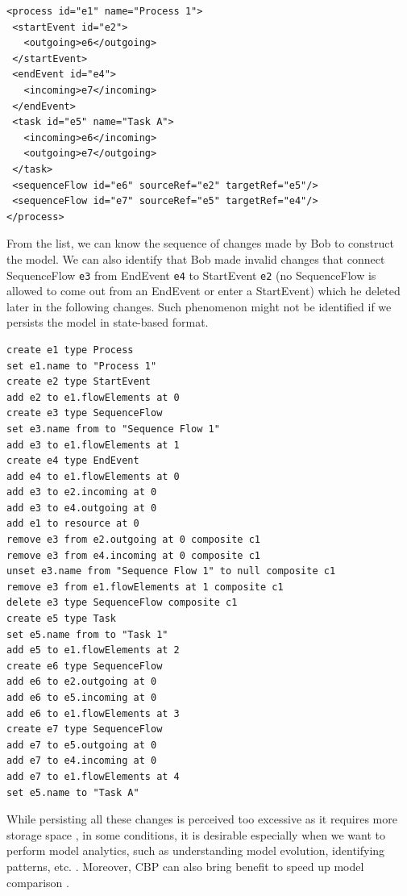 \documentclass[conference]{IEEEtran}
\begin{document}
\vspace{-15pt}
\begin{lstlisting}[style=eol,numbersep=1pt,caption={A BPMN2 model in Fig. \ref{fig:bpmn2} persisted in simplified XMI.},label=lst:bpmn2_xmi]
<process id="e1" name="Process 1">
 <startEvent id="e2">
   <outgoing>e6</outgoing>
 </startEvent>
 <endEvent id="e4">
   <incoming>e7</incoming>
 </endEvent>
 <task id="e5" name="Task A">
   <incoming>e6</incoming>
   <outgoing>e7</outgoing>
 </task>
 <sequenceFlow id="e6" sourceRef="e2" targetRef="e5"/>
 <sequenceFlow id="e7" sourceRef="e5" targetRef="e4"/>
</process>
\end{lstlisting}

From the list, we can know the sequence of changes made by Bob to construct the model. We can also identify that Bob made invalid changes 
that connect SequenceFlow \texttt{e3} from EndEvent \texttt{e4} to StartEvent \texttt{e2} 
(no SequenceFlow is allowed to come out from an EndEvent or enter a StartEvent) which he deleted later in the following changes. 
Such phenomenon might not be identified if we persists the model in state-based format. 

\vspace{-15pt}
\begin{lstlisting}[style=eol,numbersep=5pt,caption={The pseudo-formatted CBP of the model in Fig. \ref{fig:bpmn2}.},label=lst:bpmn2_cbp]
create e1 type Process
set e1.name to "Process 1"
create e2 type StartEvent
add e2 to e1.flowElements at 0
create e3 type SequenceFlow
set e3.name from to "Sequence Flow 1"
add e3 to e1.flowElements at 1
create e4 type EndEvent
add e4 to e1.flowElements at 0
add e3 to e2.incoming at 0
add e3 to e4.outgoing at 0
add e1 to resource at 0
remove e3 from e2.outgoing at 0 composite c1
remove e3 from e4.incoming at 0 composite c1
unset e3.name from "Sequence Flow 1" to null composite c1
remove e3 from e1.flowElements at 1 composite c1
delete e3 type SequenceFlow composite c1
create e5 type Task
set e5.name from to "Task 1"
add e5 to e1.flowElements at 2
create e6 type SequenceFlow
add e6 to e2.outgoing at 0
add e6 to e5.incoming at 0
add e6 to e1.flowElements at 3
create e7 type SequenceFlow
add e7 to e5.outgoing at 0
add e7 to e4.incoming at 0
add e7 to e1.flowElements at 4
set e5.name to "Task A"
\end{lstlisting}

While persisting all these changes is perceived too excessive as it requires more storage space \cite{DBLP:conf/models/YohannisRPK18}, 
in some conditions, it is desirable especially when we want to perform model analytics, 
such as understanding model evolution, identifying patterns, etc. \cite{DBLP:conf/models/YohannisKP17}. 
Moreover, CBP can also bring benefit to speed up model comparison \cite{yohannis2018efficient}.
\end{document}

